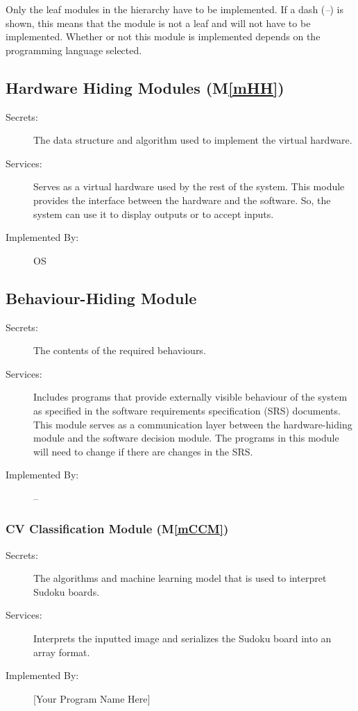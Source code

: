\documentclass[12pt, titlepage]{article}
\newcommand{\mref}[1]{M\ref{#1}}
\begin{document}
Only the leaf modules in the
hierarchy have to be implemented. If a dash (\emph{--}) is shown, this means
that the module is not a leaf and will not have to be implemented. Whether or
not this module is implemented depends on the programming language
selected.

\subsection{Hardware Hiding Modules (\mref{mHH})}

\begin{description}
\item[Secrets:]The data structure and algorithm used to implement the virtual
  hardware.
\item[Services:]Serves as a virtual hardware used by the rest of the
  system. This module provides the interface between the hardware and the
  software. So, the system can use it to display outputs or to accept inputs.
\item[Implemented By:] OS
\end{description}

\subsection{Behaviour-Hiding Module}

\begin{description}
\item[Secrets:]The contents of the required behaviours.
\item[Services:]Includes programs that provide externally visible behaviour of
  the system as specified in the software requirements specification (SRS)
  documents. This module serves as a communication layer between the
  hardware-hiding module and the software decision module. The programs in this
  module will need to change if there are changes in the SRS.
\item[Implemented By:] --
\end{description}

\subsubsection{CV Classification Module (\mref{mCCM})}

\begin{description}
\item[Secrets:] The algorithms and machine learning model that is used to interpret Sudoku boards.
\item[Services:] Interprets the inputted image and serializes the Sudoku board into an array format.
\item[Implemented By:] [Your Program Name Here]
\end{description}
\end{document}
